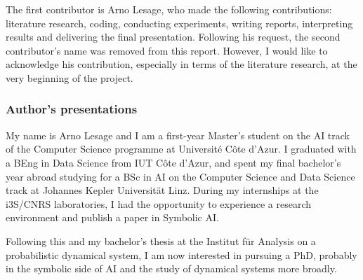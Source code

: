 \documentclass[9pt,twocolumn,twoside]{ilcss}
\theoremstyle{definition}
\theoremstyle{remark}
\theoremstyle{definition}
\theoremstyle{definition}
\begin{document}
    The first contributor is Arno Lesage, who made the following contributions: literature research, coding, conducting experiments, writing reports, interpreting results and delivering the final presentation. 
    Following his request, the second contributor's name was removed from this report. However, I would like to acknowledge his contribution, especially in terms of the literature research, at the very beginning of the project.
    
    \subsubsection*{Author's presentations}
    My name is Arno Lesage and I am a first-year Master's student on the AI track of the Computer Science programme at Université Côte d'Azur. I graduated with a BEng in Data Science from IUT Côte d'Azur, and spent my final bachelor's year abroad studying for a BSc in AI on the Computer Science and Data Science track at Johannes Kepler Universität Linz.
    During my internships at the i3S/CNRS laboratories, I had the opportunity to experience a research environment and publish a paper in Symbolic AI. 
    
    Following this and my bachelor's thesis at the Institut für Analysis on a probabilistic dynamical system, I am now interested in pursuing a PhD, probably in the symbolic side of AI and the study of dynamical systems more broadly.
    


\end{document}
